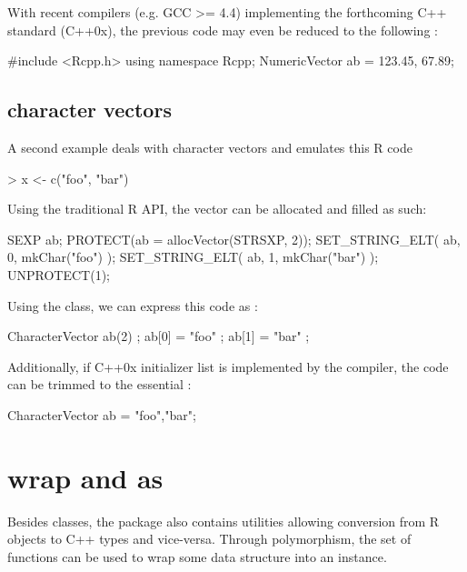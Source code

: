 With recent compilers (e.g. GCC >= 4.4) implementing the forthcoming 
C++ standard (C++0x), the previous code may even be reduced 
to the following :

\begin{example}
#include <Rcpp.h>
using namespace Rcpp;
NumericVector ab = {123.45, 67.89};
\end{example}

\subsection{character vectors}

A second example deals with character vectors and emulates this R code

\begin{example}
> x <- c("foo", "bar")
\end{example}

Using the traditional R API, the vector can be allocated and filled as such:

\begin{example}
SEXP ab;
PROTECT(ab = allocVector(STRSXP, 2));
SET_STRING_ELT( ab, 0, mkChar("foo") );
SET_STRING_ELT( ab, 1, mkChar("bar") );
UNPROTECT(1);
\end{example}

Using the  class, we can express this code as : 

\begin{example}
CharacterVector ab(2) ;
ab[0] = "foo" ;
ab[1] = "bar" ;
\end{example}

Additionally, if C++0x initializer list is implemented by the compiler, the 
code can be trimmed to the essential :

\begin{example}
CharacterVector ab = {"foo","bar"};
\end{example}


\section{wrap and as}

Besides classes, the  package also contains utilities allowing
conversion from R objects to C++ types and vice-versa. Through 
polymorphism, the  set of functions can be used to wrap 
some data structure into an  instance. 

